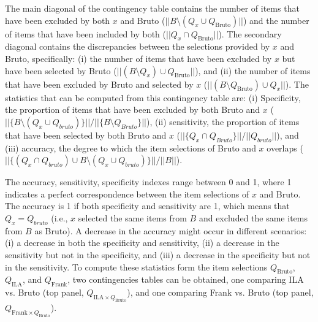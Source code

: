 \documentclass[12pt, a4paper, titilepage]{article}
\begin{document}
The main diagonal of the contingency table contains the number of items that have been excluded by both $x$ and Bruto ($||B \setminus ( Q_x \cup Q_{\text{Bruto}})||$) and the number of items that have been included by both ($||Q_x \cap Q_{\text{Bruto}}||$). The secondary diagonal contains the discrepancies between the selections provided by $x$ and Bruto, specifically: (i) the number of items that have been excluded by $x$ but have been selected by Bruto ($||(B \setminus Q_x) \cup Q_{\text{Bruto}}||$), and (ii) the number of items that have been excluded by Bruto and selected by $x$ ($||(B \setminus Q_{\text{Bruto}}) \cup Q_{x}||$). 
The statistics that can be computed from this contingency table are: (i) Specificity, the proportion of items that have been excluded by both Bruto and $x$ ($||\{B \setminus (Q_x \cup Q_{bruto})\}||/||\{B \setminus Q_{Bruto}\}||$), (ii) sensitivity, the proportion of items that have been selected by both Bruto and $x$ ($||\{Q_x \cap Q_{Bruto}\}||/ ||Q_{bruto}||$), and (iii) accuracy, the degree to which the item selections of Bruto and $x$ overlaps ($||\{(Q_x \cap Q_{bruto}) \cup B \setminus (Q_x \cup Q_{bruto})\}||/ ||B||$).


%
%
%	
%	

The accuracy, sensitivity, specificity indexes range between 0 and 1, where 1 indicates a perfect correspondence between the item selections of $x$ and Bruto.
The accuracy is 1 if both specificity and sensitivity are 1, which means that $Q_x = Q_{bruto}$ (i.e., $x$ selected the same items from $B$ and excluded the same items from $B$ as Bruto). A decrease in the accuracy might occur in different scenarios: (i) a decrease in both the specificity and sensitivity, (ii) a decrease in the sensitivity but not in the specificity, and (iii) a decrease in the specificity but not in the sensitivity. 
To compute these statistics form the item selections $Q_{\text{Bruto}}$, $Q_{\text{ILA}}$, and $Q_{\text{Frank}}$, two contingencies tables can be obtained, one comparing ILA vs. Bruto (top panel, $Q_{\text{ILA} \times Q_{\text{Bruto}}}$), and one comparing Frank vs. Bruto (top panel, $Q_{\text{Frank} \times Q_{\text{Bruto}}}$).
\end{document}
